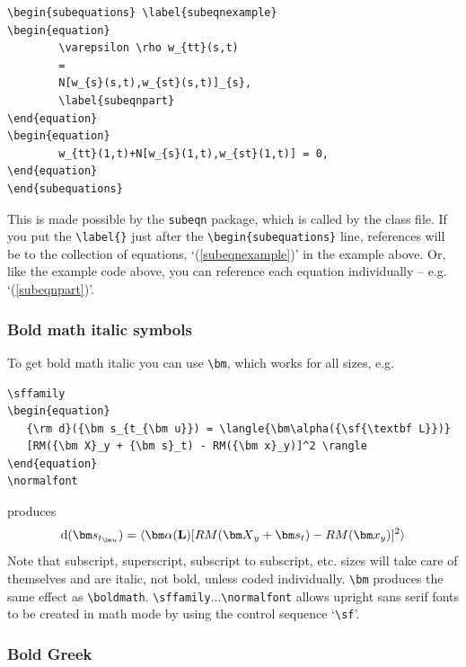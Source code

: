 \documentclass{gCMB2e}
\begin{document}
\begin{verbatim}
\begin{subequations} \label{subeqnexample}
\begin{equation}
        \varepsilon \rho w_{tt}(s,t)
        =
        N[w_{s}(s,t),w_{st}(s,t)]_{s},
        \label{subeqnpart}
\end{equation}
\begin{equation}
        w_{tt}(1,t)+N[w_{s}(1,t),w_{st}(1,t)] = 0,
\end{equation}
\end{subequations}
\end{verbatim}
This is made possible by the {\tt{subeqn}} package, which is called
by the class file. If you put the \verb"\label{}" just after the
\verb"\begin{subequations}" line, references will be to the
collection of equations, `(\ref{subeqnexample})' in the example
above. Or, like the example code above, you can reference each
equation individually -- e.g. `(\ref{subeqnpart})'.

\subsubsection{Bold math italic symbols}

To get bold math italic you can use \verb"\bm", which works for
all sizes, e.g.
%
\begin{verbatim}
\sffamily
\begin{equation}
   {\rm d}({\bm s_{t_{\bm u}}) = \langle{\bm\alpha({\sf{\textbf L}})}
   [RM({\bm X}_y + {\bm s}_t) - RM({\bm x}_y)]^2 \rangle
\end{equation}
\normalfont
\end{verbatim}
%
produces\sffamily
\begin{equation}
   {\rm d}({\bm s_{t_{\bm u}}}) = \langle {\bm\alpha({\sf{\textbf L}})}[RM({\bm X}_y
   + {\bm s}_t) - RM({\bm x}_y)]^2 \rangle
\end{equation}\normalfont
Note that subscript, superscript, subscript to subscript, etc.
sizes will take care of themselves and are italic, not bold,
unless coded individually. \verb"\bm" produces the same effect as
\verb"\boldmath". \verb"\sffamily"...\verb"\normalfont" allows
upright sans serif fonts to be created in math mode by using the
control sequence `\verb"\sf"'.

\subsubsection{Bold Greek}\label{boldgreek}
\end{document}
